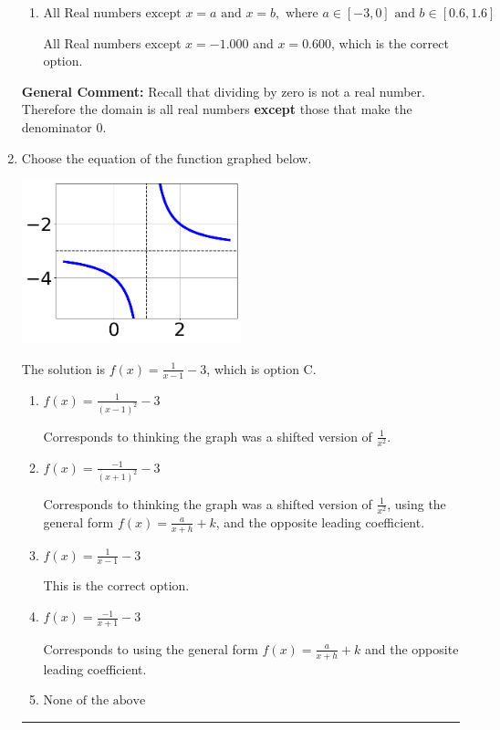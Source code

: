 \documentclass{extbook}[14pt]
\newcommand{\litem}[1]{\item #1

\rule{\textwidth}{0.4pt}}
\begin{document}
\begin{enumerate}
{\begin{enumerate}[label=\Alph*.]
All Real numbers except $x = -1.000$, which corresponds to removing only 1 value from the denominator.
\item \( \text{All Real numbers except } x = a \text{ and } x = b, \text{ where } a \in [-3, 0] \text{ and } b \in [0.6, 1.6] \)

All Real numbers except $x = -1.000$ and $x = 0.600$, which is the correct option.
\end{enumerate}

\textbf{General Comment:} Recall that dividing by zero is not a real number. Therefore the domain is all real numbers \textbf{except} those that make the denominator 0.
}
\litem{
Choose the equation of the function graphed below.

\begin{center}
    \includegraphics[width=0.5\textwidth]{../Figures/rationalGraphToEquationCopyA.png}
\end{center}


The solution is \( f(x) = \frac{1}{x - 1} - 3 \), which is option C.\begin{enumerate}[label=\Alph*.]
\item \( f(x) = \frac{1}{(x - 1)^2} - 3 \)

Corresponds to thinking the graph was a shifted version of $\frac{1}{x^2}$.
\item \( f(x) = \frac{-1}{(x + 1)^2} - 3 \)

Corresponds to thinking the graph was a shifted version of $\frac{1}{x^2}$, using the general form $f(x) = \frac{a}{x+h}+k$, and the opposite leading coefficient.
\item \( f(x) = \frac{1}{x - 1} - 3 \)

This is the correct option.
\item \( f(x) = \frac{-1}{x + 1} - 3 \)

Corresponds to using the general form $f(x) = \frac{a}{x+h}+k$ and the opposite leading coefficient.
\item \( \text{None of the above} \)


\end{enumerate}}
\end{enumerate}
\end{document}
